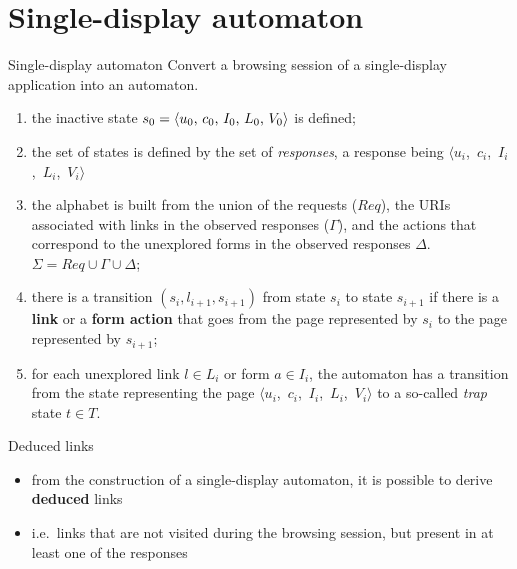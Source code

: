 \documentclass[usenames,dvipsnames]{beamer}
\newcommand{\res}[1][]{
  \ifthenelse{\equal{#1}{}}{\mbox{$\langle u$, $c$, $I$, $L$, $V\rangle$}}
  {\mbox{$\langle u_{#1}$, $c_{#1}$, $I_{#1}$, $L_{#1}$, $V_{#1}\rangle$}}
}
\theoremstyle{definition}
\begin{document}

\section{Single-display automaton}
\begin{frame}{Single-display automaton}
  Convert a browsing session of a single-display application into an automaton.

  \begin{enumerate}
    \item the inactive state $s_0 = \res[0]$ is defined;
    \item the set of states is defined by the set of \emph{responses}, a response being \res[i]
    \item the alphabet is built from the union of the requests ($Req$), the URIs associated with links in the observed responses ($\Gamma$), and the actions that correspond to the unexplored forms in the observed responses $\Delta$. $\Sigma=Req\cup\Gamma\cup\Delta$;
    \item there is a transition $(s_i,l_{i+1},s_{i+1})$ from state $s_i$ to state $s_{i+1}$ if there is a \textbf{link} or a \textbf{form action} that goes from the page represented by $s_i$ to the page represented by $s_{i+1}$;
    \item for each unexplored link $l \in L_i$ or form $a \in I_i$, the automaton has a transition from the state representing the page \res[i] to a so-called \textit{trap} state $t \in T$.
  \end{enumerate}
\end{frame}

\begin{frame}{Deduced links}
  \begin{itemize}
    \item from the construction of a single-display automaton, it is possible to derive \textbf{deduced} links
    \item i.e.\ links that are not visited during the browsing session, but present in at least one of the responses
  \end{itemize}
\end{frame}
\end{document}

